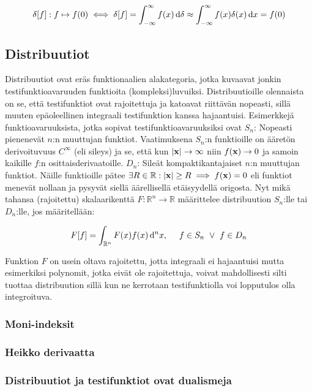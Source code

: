 \documentclass[../johdoksia.tex]{subfiles}
\begin{document}
	\begin{equation}
		\delta[f]: f \mapsto f(0) \iff \delta[f] = \int_{-\infty}^{\infty}f(x)\odif{\delta} \approx \int_{-\infty}^{\infty}f(x)\delta(x)\odif{x} = f(0)
	\end{equation}

	\subsection{Distribuutiot}
	
	Distribuutiot ovat eräs funktionaalien alakategoria, jotka kuvaavat jonkin testifunktioavaruuden funktioita (kompleksi)luvuiksi. Distribuutioille olennaista on se, että testifunktiot ovat rajoitettuja ja katoavat riittävän nopeasti, sillä muuten epäoleellinen integraali testifunktion kanssa hajaantuisi. Esimerkkejä funktioavaruuksista, jotka sopivat testifunktioavaruuksiksi ovat $S_n$: Nopeasti pienenevät $n$:n muuttujan funktiot. Vaatimuksena $S_n$:n funktioille on ääretön derivoituvuus $C^\infty$ (eli sileys) ja se, että kun $|\mathbf{x}| \to \infty$ niin $f(\mathbf{x}) \to 0$ ja samoin kaikille $f$:n osittaisderivaatoille. $D_n$: Sileät kompaktikantajaiset $n$:n muuttujan funktiot. Näille funktioille pätee $\exists R\in \mathbb{R}: |\mathbf{x}| \geq R \implies f(\mathbf{x}) = 0$ eli funktiot menevät nollaan ja pysyvät siellä äärellisellä etäisyydellä origosta. Nyt mikä tahansa (rajoitettu) skalaarikenttä $F: \mathbb{R}^n \to \mathbb{R}$ määrittelee distribuution $S_n$:lle tai $D_n$:lle, jos määritellään:
	
	\begin{equation*}
		F[f] = \int_{\mathbb{R}^{n}}F(x)f(x)\odif{^nx}, \ \ \ \ f \in S_n \ \lor \ f \in D_n
	\end{equation*}

	Funktion $F$ on usein oltava rajoitettu, jotta integraali ei hajaantuisi mutta esimerkiksi polynomit, jotka eivät ole rajoitettuja, voivat mahdollisesti silti tuottaa distribuution sillä kun ne kerrotaan testifunktiolla voi lopputulos olla integroituva.

	\subsubsection{Moni-indeksit}
	\subsubsection{Heikko derivaatta}
	\subsubsection{Distribuutiot ja testifunktiot ovat dualismeja}
	
	
\end{document}
